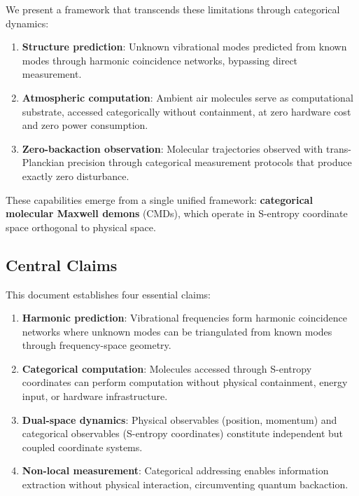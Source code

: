 \documentclass[11pt]{article}
\begin{document}
We present a framework that transcends these limitations through categorical dynamics:

\begin{enumerate}
\item \textbf{Structure prediction}: Unknown vibrational modes predicted from known modes through harmonic coincidence networks, bypassing direct measurement.

\item \textbf{Atmospheric computation}: Ambient air molecules serve as computational substrate, accessed categorically without containment, at zero hardware cost and zero power consumption.

\item \textbf{Zero-backaction observation}: Molecular trajectories observed with trans-Planckian precision through categorical measurement protocols that produce exactly zero disturbance.
\end{enumerate}

These capabilities emerge from a single unified framework: \textbf{categorical molecular Maxwell demons} (CMDs), which operate in S-entropy coordinate space orthogonal to physical space.

\subsection{Central Claims}

This document establishes four essential claims:

\begin{enumerate}
\item \textbf{Harmonic prediction}: Vibrational frequencies form harmonic coincidence networks where unknown modes can be triangulated from known modes through frequency-space geometry.

\item \textbf{Categorical computation}: Molecules accessed through S-entropy coordinates can perform computation without physical containment, energy input, or hardware infrastructure.

\item \textbf{Dual-space dynamics}: Physical observables (position, momentum) and categorical observables (S-entropy coordinates) constitute independent but coupled coordinate systems.

\item \textbf{Non-local measurement}: Categorical addressing enables information extraction without physical interaction, circumventing quantum backaction.
\end{enumerate}
\end{document}
